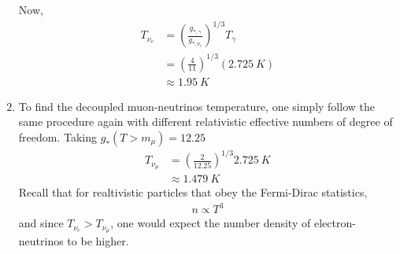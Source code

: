 \begin{enumerate}[label=\alph*)]
Now,
\begin{align}
T_{\nu_e} &= \left(\frac{g_{\ast,\gamma}}{g_{\ast,\nu_e}}\right)^{1/3}T_\gamma \\
&= \left( \frac{4}{11} \right)^{1/3} \left(\SI{2.725}{K}\right) \\
&\approx \SI{1.95}{K}
\end{align}

\item To find the decoupled muon-neutrinos temperature, one simply follow the same procedure again with different relativistic effective numbers of degree of freedom. Taking $g_{\ast} (T>m_{\mu})=  12.25$ 
\begin{align}
T_{\nu_\mu} &= \left(\frac{2}{12.25}\right)^{1/3}\SI{2.725}{K}\\
&\approx \SI{1.479}{K}
\end{align}
Recall that for realtivistic particles that obey the Fermi-Dirac statistics, 
\begin{align}
n \propto T^3
\end{align}
and since $T_{\nu_e} > T_{\nu_\mu}$, one would expect the number density of electron-neutrinos to be higher.


\end{enumerate}

